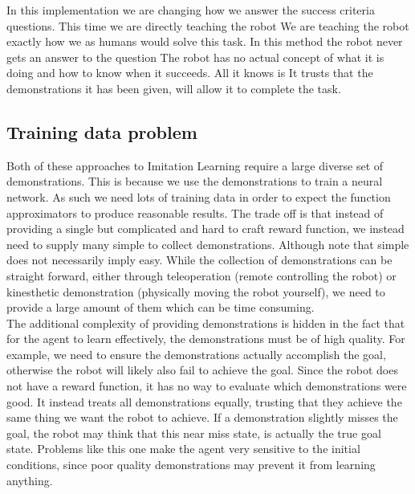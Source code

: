 In this implementation we are changing how we answer the success criteria questions. This time we are directly teaching the robot  We are teaching the robot exactly how we as humans would solve this task. In this method the robot never gets an answer to the question  The robot has no actual concept of what it is doing and how to know when it succeeds. All it knows is  It trusts that the demonstrations it has been given, will allow it to complete the task.

\subsection{Training data problem}
Both of these approaches to Imitation Learning require a large diverse set of demonstrations. This is because we use the demonstrations to train a neural network. As such we need lots of training data in order to expect the function approximators to produce reasonable results. The trade off is that instead of providing a single but complicated and hard to craft reward function, we instead need to supply many simple to collect demonstrations. Although note that simple does not necessarily imply easy. While the collection of demonstrations can be straight forward, either through teleoperation (remote controlling the robot) or kinesthetic demonstration (physically moving the robot yourself), we need to provide a large amount of them which can be time consuming.\\

The additional complexity of providing demonstrations is hidden in the fact that for the agent to learn effectively, the demonstrations must be of high quality. For example, we need to ensure the demonstrations actually accomplish the goal, otherwise the robot will likely also fail to achieve the goal. Since the robot does not have a reward function, it has no way to evaluate which demonstrations were good. It instead treats all demonstrations equally, trusting that they achieve the same thing we want the robot to achieve. If a demonstration slightly misses the goal, the robot may think that this near miss state, is actually the true goal state. Problems like this one make the agent very sensitive to the initial conditions, since poor quality demonstrations may prevent it from learning anything.

